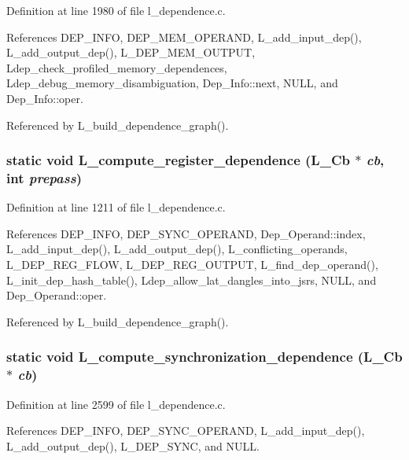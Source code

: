 Definition at line 1980 of file l\_\-dependence.c.

References DEP\_\-INFO, DEP\_\-MEM\_\-OPERAND, L\_\-add\_\-input\_\-dep(), L\_\-add\_\-output\_\-dep(), L\_\-DEP\_\-MEM\_\-OUTPUT, Ldep\_\-check\_\-profiled\_\-memory\_\-dependences, Ldep\_\-debug\_\-memory\_\-disambiguation, Dep\_\-Info::next, NULL, and Dep\_\-Info::oper.

Referenced by L\_\-build\_\-dependence\_\-graph().
\subsubsection{\setlength{\rightskip}{0pt plus 5cm}static void L\_\-compute\_\-register\_\-dependence (L\_\-Cb $\ast$ {\em cb}, int {\em prepass})\hspace{0.3cm}{\tt  [static]}}\label{l__dependence_8c_ddf74edbb73637b030c329169d91c526}




Definition at line 1211 of file l\_\-dependence.c.

References DEP\_\-INFO, DEP\_\-SYNC\_\-OPERAND, Dep\_\-Operand::index, L\_\-add\_\-input\_\-dep(), L\_\-add\_\-output\_\-dep(), L\_\-conflicting\_\-operands, L\_\-DEP\_\-REG\_\-FLOW, L\_\-DEP\_\-REG\_\-OUTPUT, L\_\-find\_\-dep\_\-operand(), L\_\-init\_\-dep\_\-hash\_\-table(), Ldep\_\-allow\_\-lat\_\-dangles\_\-into\_\-jsrs, NULL, and Dep\_\-Operand::oper.

Referenced by L\_\-build\_\-dependence\_\-graph().
\subsubsection{\setlength{\rightskip}{0pt plus 5cm}static void L\_\-compute\_\-synchronization\_\-dependence (L\_\-Cb $\ast$ {\em cb})\hspace{0.3cm}{\tt  [static]}}\label{l__dependence_8c_8d6cef7c54348a134629e30b2857df21}




Definition at line 2599 of file l\_\-dependence.c.

References DEP\_\-INFO, DEP\_\-SYNC\_\-OPERAND, L\_\-add\_\-input\_\-dep(), L\_\-add\_\-output\_\-dep(), L\_\-DEP\_\-SYNC, and NULL.

